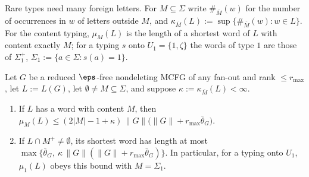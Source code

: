 Rare types need many foreign letters.  For $M\subseteq\Sigma$ write
$\#_{\overline M}(w)$ for the number of occurrences in $w$ of letters outside $M$, and
$\kappa_{\overline M}(L):=\sup\{\#_{\overline M}(w):w\in L\}$.  For the content typing,
$\mu_M(L)$ is the length of a shortest word of $L$ with content exactly $M$; for a
typing $s$ onto $U_1=\{1,\zeta\}$ the words of type $1$ are those of $\Sigma_1^+$,
$\Sigma_1:=\{a\in\Sigma:s(a)=1\}$.

\begin{proposition}
\label{prop:zeta-capacity}
Let $G$ be a reduced $\eps$-free nondeleting MCFG of any fan-out and rank
$\le r_{\max}$, let $L:=L(G)$, let $\emptyset\ne M\subseteq\Sigma$, and suppose
$\kappa:=\kappa_{\overline M}(L)<\infty$.
\begin{enumerate}[label=\textup{(\roman*)},leftmargin=*]
\item If $L$ has a word with content $M$, then
$\mu_M(L)\le(2|M|-1+\kappa)\,\|G\|\bigl(\|G\|+r_{\max}\bar\theta_G\bigr)$.
\item If $L\cap M^+\ne\emptyset$, its shortest word has length at most
$\max\{\bar\theta_G,\ \kappa\,\|G\|(\|G\|+r_{\max}\bar\theta_G)\}$.  In particular,
for a typing onto $U_1$, $\mu_1(L)$ obeys this bound with $M=\Sigma_1$.
\end{enumerate}
\end{proposition}

